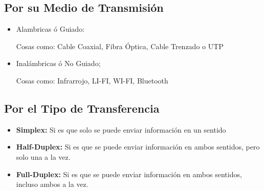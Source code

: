 \documentclass[12pt, fleqn]{report}                             %
\theoremstyle{break}                                            %
\begin{document}
            \subsection{Por su Medio de Transmisión}

                \begin{itemize}
                    \item Alambricas ó Guiado: 

                        Cosas como: Cable Coaxial, Fibra Óptica, Cable Trenzado o UTP 
                    
                    \item Inalámbricas ó  No Guiado;

                        Cosas como: Infrarrojo, LI-FI, WI-FI, Bluetooth
                \end{itemize}

            \subsection{Por el Tipo de Transferencia}

                \begin{itemize}
                    \item \textbf{Simplex:} 
                        Si es que solo se puede enviar información en un sentido 

                    \item \textbf{Half-Duplex:}
                        Si es que se puede enviar información en ambos sentidos, pero
                        solo una a la vez.

                    \item \textbf{Full-Duplex:}
                        Si es que se puede enviar información en ambos sentidos, incluso
                        ambos a la vez.

                \end{itemize}


        \clearpage
\end{document}
